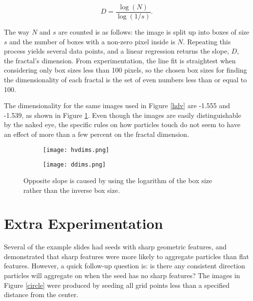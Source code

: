 \documentclass[12pt]{article}
\begin{document}
\[
D = \frac{\log(N)}{\log(1/s)} .
\]

The way $N$ and $s$ are counted is as follows: the image is split up into boxes of size $s$ and the number of boxes with a non-zero pixel inside is $N$.
Repeating this process yields several data points, and a linear regression returns the slope, $D$, the fractal's dimension.
From experimentation, the line fit is straightest when considering only box sizes less than 100 pixels, so the chosen box sizes for finding the dimensionality of each fractal is the set of even numbers less than or equal to 100.

The dimensionality for the same images used in Figure \ref{hdv} are -1.555 and -1.539, as shown in Figure \ref{dims}.
Even though the images are easily distinguishable by the naked eye, the specific rules on how particles touch do not seem to have an effect of more than a few percent on the fractal dimension.

\begin{figure}
  \centering

  \begin{subfigure}[b]{0.45\textwidth}
    \texttt{[image: hvdims.png]}
  \end{subfigure}
  \qquad
  \begin{subfigure}[b]{0.45\textwidth}
    \texttt{[image: ddims.png]}
  \end{subfigure}

  \caption{Opposite slope is caused by using the logarithm of the box size rather than the inverse box size.}
  \label{dims}

\end{figure}


\section*{Extra Experimentation}

Several of the example slides had seeds with sharp geometric features, and demonstrated that sharp features were more likely to aggregate particles than flat features.
However, a quick follow-up question is: is there any consistent direction particles will aggregate on when the seed has no sharp features?
The images in Figure \ref{circle} were produced by seeding all grid points less than a specified distance from the center.

\end{document}
